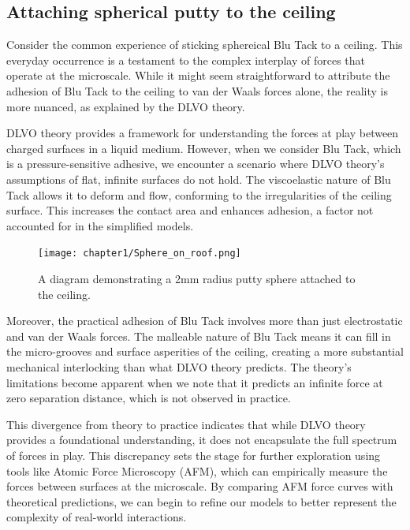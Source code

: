 \subsection{Attaching spherical putty to the ceiling}

Consider the common experience of sticking sphereical Blu Tack to a ceiling. This everyday occurrence is a testament to the complex interplay of forces that operate at the microscale. While it might seem straightforward to attribute the adhesion of Blu Tack to the ceiling to van der Waals forces alone, the reality is more nuanced, as explained by the DLVO theory.

DLVO theory provides a framework for understanding the forces at play between charged surfaces in a liquid medium. However, when we consider Blu Tack, which is a pressure-sensitive adhesive, we encounter a scenario where DLVO theory's assumptions of flat, infinite surfaces do not hold. The viscoelastic nature of Blu Tack allows it to deform and flow, conforming to the irregularities of the ceiling surface. This increases the contact area and enhances adhesion, a factor not accounted for in the simplified models.

\begin{figure}[h]     %
        \begin{center}
          \texttt{[image: chapter1/Sphere\_on\_roof.png]}
\end{center}
\caption{A diagram demonstrating a 2mm radius putty sphere attached to the ceiling.}
\label{fig:disp}                 %
\end{figure}

Moreover, the practical adhesion of Blu Tack involves more than just electrostatic and van der Waals forces. The malleable nature of Blu Tack means it can fill in the micro-grooves and surface asperities of the ceiling, creating a more substantial mechanical interlocking than what DLVO theory predicts. The theory's limitations become apparent when we note that it predicts an infinite force at zero separation distance, which is not observed in practice.

This divergence from theory to practice indicates that while DLVO theory provides a foundational understanding, it does not encapsulate the full spectrum of forces in play. This discrepancy sets the stage for further exploration using tools like Atomic Force Microscopy (AFM), which can empirically measure the forces between surfaces at the microscale. By comparing AFM force curves with theoretical predictions, we can begin to refine our models to better represent the complexity of real-world interactions.

